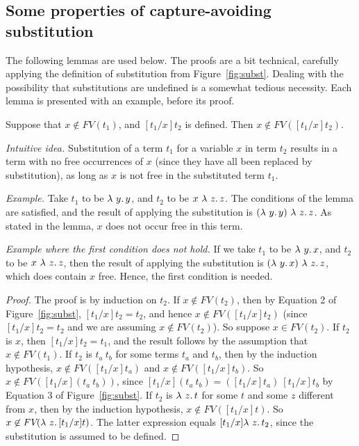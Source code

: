 \subsection{Some properties of capture-avoiding substitution}

The following lemmas are used below.  The proofs are a bit technical, carefully applying
the definition of substitution from Figure~\ref{fig:subst}.  Dealing with the possibility
that substitutions are undefined is a somewhat tedious necessity.  Each lemma is presented
with an example, before its proof.

\begin{lemma}
\label{lem:substvargone}
  Suppose that $x\not\in\textit{FV}(t_1)$, and $[t_1/x]t_2$ is defined.  Then
  $x\not\in\textit{FV}([t_1/x]t_2)$.
\end{lemma}

\noindent\textit{Intuitive idea.} Substitution of a term $t_1$ for a variable $x$ in term $t_2$ results in a term
with no free occurrences of
$x$ (since they have all been replaced by substitution), as long as $x$ is not free in the substituted term $t_1$.

\vspace{.2cm}

\noindent\textit{Example.} Take $t_1$ to be $\lambda\ y.\, y$, and $t_2$ to be $x\ \lambda\ z.\, z$.
The conditions of the lemma are satisfied, and the result of applying the substitution
is $(\lambda\ y.\, y)\ \lambda\ z.\, z$.  As stated in the lemma, $x$ does not occur free in this term.

\vspace{.2cm}

\noindent\textit{Example where the first condition does not hold.} If
we take $t_1$ to be $\lambda\ y.\, x$, and $t_2$ to be $x\ \lambda\ z.\, z$,
then the result of applying the substitution is
$(\lam{y}{x})\ \lam{z}{z}$, which does contain $x$ free.  Hence, the first condition is needed.

\begin{proof} The proof is by induction on $t_2$.
  If $x\not\in\textit{FV}(t_2)$, then by Equation 2 of Figure~\ref{fig:subst}, $[t_1/x]t_2 = t_2$, and
  hence $x\not\in\textit{FV}([t_1/x]t_2)$ (since $[t_1/x]t_2 = t_2$ and we are assuming $x\not\in\textit{FV}(t_2)$).
  So suppose $x\in\textit{FV}(t_2)$. If $t_2$ is $x$, then $[t_1/x]t_2 = t_1$,
  and the result follows by the assumption that $x\not\in\textit{FV}(t_1)$.
  If $t_2$ is $t_a\ t_b$ for some terms $t_a$ and $t_b$,
  then by the induction hypothesis, $x\not\in\textit{FV}([t_1/x]t_a)$ and $x\not\in\textit{FV}([t_1/x]t_b)$.
  So $x\not\in\textit{FV}([t_1/x](t_a\ t_b))$, since $[t_1/x](t_a\ t_b) = ([t_1/x]t_a)\ [t_1/x]t_b$ by Equation 3 of Figure~\ref{fig:subst}.
  If $t_2$ is $\lambda\ z.\, t$ for some $t$ and some $z$ different from $x$,
  then by the induction hypothesis, $x\not\in\textit{FV}([t_1/x]t)$.  So $x\not\in\textit{FV}(\lambda\ z.\, [t_1/x]t)$.  The
  latter expression
    equals $[t_1/x]\lambda\ z.\, t_2$, since the substitution is assumed to be defined.
\end{proof}


